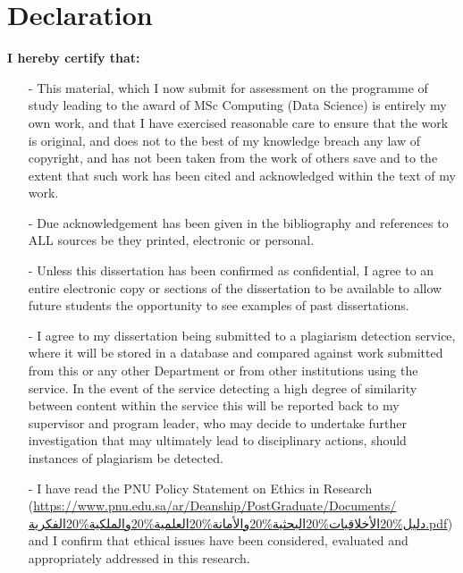 \documentclass[12.5pt]{article}
\begin{document}
\begin{spacing}{-2}
\tableofcontents 
\end{spacing}

\newpage

\section*{Declaration}

\noindent
\textbf{I hereby certify that:}

\begin{itemize}
\item[-] This material, which I now submit for assessment on the programme of study leading to the award of MSc Computing (Data Science) is entirely my own work, and that I have exercised reasonable care to ensure that the work is original, and does not to the best of my knowledge breach any law of copyright, and has not been taken from the work of others save and to the extent that such work has been cited and acknowledged within the text of my work.
\item[-] Due acknowledgement has been given in the bibliography and references to ALL sources be they printed, electronic or personal.
\item[-] Unless this dissertation has been confirmed as confidential, I agree to an entire electronic copy or sections of the dissertation to be available to allow future students the opportunity to see examples of past dissertations.
\item[-] I agree to my dissertation being submitted to a plagiarism detection service, where it will be stored in a database and compared against work submitted from this or any other Department or from other institutions using the service. In the event of the service detecting a high degree of similarity between content within the service this will be reported back to my supervisor and program leader, who may decide to undertake further investigation that may ultimately lead to disciplinary actions, should instances of plagiarism be detected.
\item[-] I have read the PNU Policy Statement on Ethics in Research (\url{https://www.pnu.edu.sa/ar/Deanship/PostGraduate/Documents/دليل%20الأخلاقيات%20البحثية%20والأمانة%20العلمية%20والملكية%20الفكرية.pdf}) and I confirm that ethical issues have been considered, evaluated and appropriately addressed in this research.
\end{itemize}

\vspace{1cm}
\end{document}
